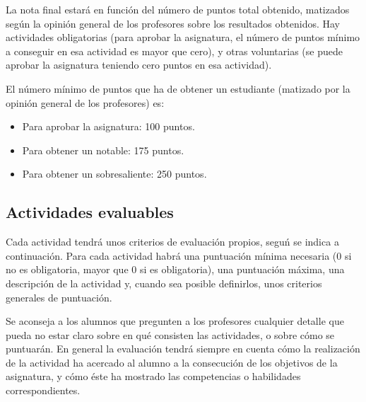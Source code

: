 \documentclass[a4paper,12pt]{article}
\begin{document}
La nota final estará en función del número de puntos total obtenido, matizados según la opinión general de los profesores sobre los resultados obtenidos. Hay actividades obligatorias (para aprobar la asignatura, el número de puntos mínimo a conseguir en esa actividad es mayor que cero), y otras voluntarias (se puede aprobar la asignatura teniendo cero puntos en esa actividad).

El número mínimo de puntos que ha de obtener un estudiante (matizado por la opinión general de los profesores) es:

\begin{itemize}
\item Para aprobar la asignatura: 100 puntos.
\item Para obtener un notable: 175 puntos.
\item Para obtener un sobresaliente: 250 puntos.
\end{itemize}

\subsection{Actividades evaluables}

Cada actividad tendrá unos criterios de evaluación propios, seguń se indica a continuación. Para cada actividad habrá una puntuación mínima necesaria (0 si no es obligatoria, mayor que 0 si es obligatoria), una puntuación máxima, una descripción de la actividad y, cuando sea posible definirlos, unos criterios generales de puntuación.

Se aconseja a los alumnos que pregunten a los profesores cualquier detalle que pueda no estar claro sobre en qué consisten las actividades, o sobre cómo se puntuarán. En general la evaluación tendrá siempre en cuenta cómo la realización de la actividad ha acercado al alumno a la consecución de los objetivos de la asignatura, y cómo éste ha mostrado las competencias o habilidades correspondientes.
\end{document}
